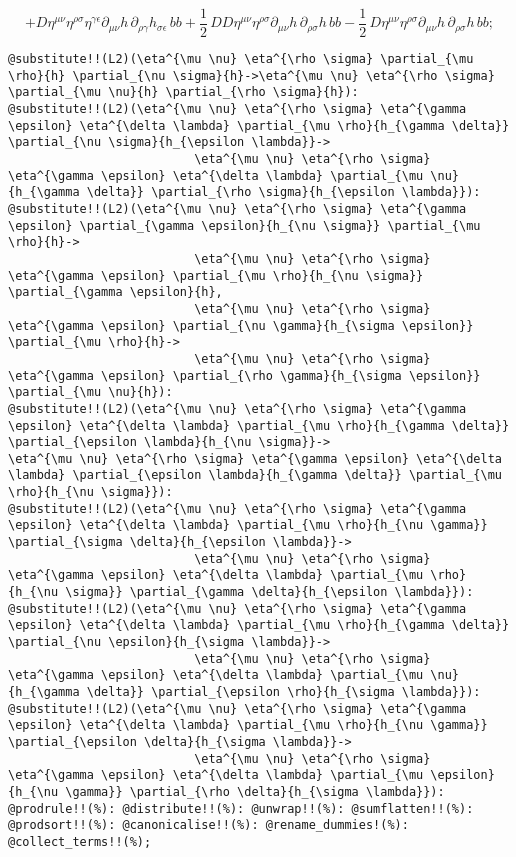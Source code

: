 \documentclass[11pt]{article}
\begin{document}
\begin{dmath*}[compact, spread=2pt]
 + D {\eta}^{\mu \nu} {\eta}^{\rho \sigma} {\eta}^{\gamma \epsilon} {\partial}_{\mu \nu}{h}\,  {\partial}_{\rho \gamma}{{h}_{\sigma \epsilon}}\,  b b + \frac{1}{2}\, D D {\eta}^{\mu \nu} {\eta}^{\rho \sigma} {\partial}_{\mu \nu}{h}\,  {\partial}_{\rho \sigma}{h}\,  b b - \frac{1}{2}\, D {\eta}^{\mu \nu} {\eta}^{\rho \sigma} {\partial}_{\mu \nu}{h}\,  {\partial}_{\rho \sigma}{h}\,  b b;
\end{dmath*}
{\color[named]{Blue}\begin{verbatim}
@substitute!!(L2)(\eta^{\mu \nu} \eta^{\rho \sigma} \partial_{\mu \rho}{h} \partial_{\nu \sigma}{h}->\eta^{\mu \nu} \eta^{\rho \sigma} \partial_{\mu \nu}{h} \partial_{\rho \sigma}{h}):
@substitute!!(L2)(\eta^{\mu \nu} \eta^{\rho \sigma} \eta^{\gamma \epsilon} \eta^{\delta \lambda} \partial_{\mu \rho}{h_{\gamma \delta}} \partial_{\nu \sigma}{h_{\epsilon \lambda}}->
                          \eta^{\mu \nu} \eta^{\rho \sigma} \eta^{\gamma \epsilon} \eta^{\delta \lambda} \partial_{\mu \nu}{h_{\gamma \delta}} \partial_{\rho \sigma}{h_{\epsilon \lambda}}):
@substitute!!(L2)(\eta^{\mu \nu} \eta^{\rho \sigma} \eta^{\gamma \epsilon} \partial_{\gamma \epsilon}{h_{\nu \sigma}} \partial_{\mu \rho}{h}->
                          \eta^{\mu \nu} \eta^{\rho \sigma} \eta^{\gamma \epsilon} \partial_{\mu \rho}{h_{\nu \sigma}} \partial_{\gamma \epsilon}{h},
                          \eta^{\mu \nu} \eta^{\rho \sigma} \eta^{\gamma \epsilon} \partial_{\nu \gamma}{h_{\sigma \epsilon}} \partial_{\mu \rho}{h}->
                          \eta^{\mu \nu} \eta^{\rho \sigma} \eta^{\gamma \epsilon} \partial_{\rho \gamma}{h_{\sigma \epsilon}} \partial_{\mu \nu}{h}):
@substitute!!(L2)(\eta^{\mu \nu} \eta^{\rho \sigma} \eta^{\gamma \epsilon} \eta^{\delta \lambda} \partial_{\mu \rho}{h_{\gamma \delta}} \partial_{\epsilon \lambda}{h_{\nu \sigma}}->
\eta^{\mu \nu} \eta^{\rho \sigma} \eta^{\gamma \epsilon} \eta^{\delta \lambda} \partial_{\epsilon \lambda}{h_{\gamma \delta}} \partial_{\mu \rho}{h_{\nu \sigma}}):
@substitute!!(L2)(\eta^{\mu \nu} \eta^{\rho \sigma} \eta^{\gamma \epsilon} \eta^{\delta \lambda} \partial_{\mu \rho}{h_{\nu \gamma}} \partial_{\sigma \delta}{h_{\epsilon \lambda}}->
                          \eta^{\mu \nu} \eta^{\rho \sigma} \eta^{\gamma \epsilon} \eta^{\delta \lambda} \partial_{\mu \rho}{h_{\nu \sigma}} \partial_{\gamma \delta}{h_{\epsilon \lambda}}):
@substitute!!(L2)(\eta^{\mu \nu} \eta^{\rho \sigma} \eta^{\gamma \epsilon} \eta^{\delta \lambda} \partial_{\mu \rho}{h_{\gamma \delta}} \partial_{\nu \epsilon}{h_{\sigma \lambda}}->
                          \eta^{\mu \nu} \eta^{\rho \sigma} \eta^{\gamma \epsilon} \eta^{\delta \lambda} \partial_{\mu \nu}{h_{\gamma \delta}} \partial_{\epsilon \rho}{h_{\sigma \lambda}}):
@substitute!!(L2)(\eta^{\mu \nu} \eta^{\rho \sigma} \eta^{\gamma \epsilon} \eta^{\delta \lambda} \partial_{\mu \rho}{h_{\nu \gamma}} \partial_{\epsilon \delta}{h_{\sigma \lambda}}->
                          \eta^{\mu \nu} \eta^{\rho \sigma} \eta^{\gamma \epsilon} \eta^{\delta \lambda} \partial_{\mu \epsilon}{h_{\nu \gamma}} \partial_{\rho \delta}{h_{\sigma \lambda}}):
@prodrule!!(%): @distribute!!(%): @unwrap!!(%): @sumflatten!!(%):
@prodsort!!(%): @canonicalise!!(%): @rename_dummies!(%): @collect_terms!!(%);
\end{verbatim}}
\end{document}
